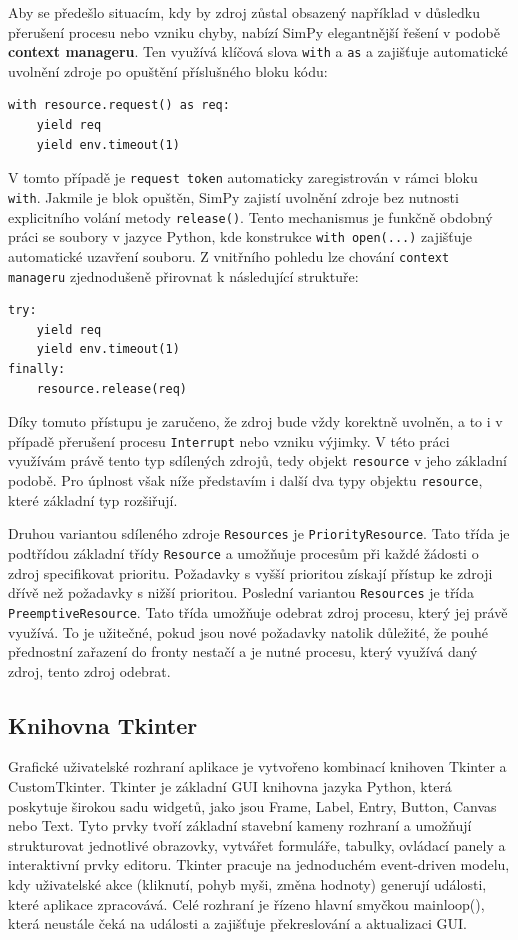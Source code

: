\documentclass[
  program=itp,
  biblatex,
  figures=false,
  glossaries,
  index
]{kidiplom}
\begin{document}
Aby se předešlo situacím, kdy by zdroj zůstal obsazený například v důsledku přerušení procesu nebo vzniku chyby, nabízí SimPy elegantnější řešení v podobě \textbf{context manageru}. Ten využívá klíčová slova \texttt{with} a \texttt{as} a zajišťuje automatické uvolnění zdroje po opuštění příslušného bloku kódu:

\begin{verbatim}
with resource.request() as req:
    yield req              
    yield env.timeout(1)
\end{verbatim}

V tomto případě je \texttt{request token} automaticky zaregistrován v rámci bloku \texttt{with}. Jakmile je blok opuštěn, SimPy zajistí uvolnění zdroje bez nutnosti explicitního volání metody \texttt{release()}. Tento mechanismus je funkčně obdobný práci se soubory v jazyce Python, kde konstrukce \texttt{with open(...)} zajišťuje automatické uzavření souboru. Z vnitřního pohledu lze chování \texttt{context manageru} zjednodušeně přirovnat k následující struktuře:

\begin{verbatim}
try:
    yield req
    yield env.timeout(1)
finally:
    resource.release(req)
\end{verbatim}

Díky tomuto přístupu je zaručeno, že zdroj bude vždy korektně uvolněn, a to i v případě přerušení procesu \texttt{Interrupt} nebo vzniku výjimky.  V této práci využívám právě tento typ sdílených zdrojů, tedy objekt \texttt{resource} v jeho základní podobě. Pro úplnost však níže představím i další dva typy objektu \texttt{resource}, které základní typ rozšiřují.

Druhou variantou sdíleného zdroje \texttt{Resources} je \texttt{PriorityResource}. Tato třída je podtřídou základní třídy \texttt{Resource} a umožňuje procesům při každé žádosti o zdroj specifikovat prioritu. Požadavky s vyšší prioritou získají přístup ke zdroji dřívě než požadavky s nižší prioritou. Poslední variantou \texttt{Resources} je třída \texttt{PreemptiveResource}. Tato třída umožňuje odebrat zdroj procesu, který jej právě využívá. To je užitečné, pokud jsou nové požadavky natolik důležité, že pouhé přednostní zařazení do fronty nestačí a je nutné procesu, který využívá daný zdroj, tento zdroj odebrat.

\subsection{Knihovna Tkinter}
Grafické uživatelské rozhraní aplikace je vytvořeno kombinací knihoven Tkinter a CustomTkinter. Tkinter je základní GUI knihovna jazyka Python, která poskytuje širokou sadu widgetů, jako jsou Frame, Label, Entry, Button, Canvas nebo Text. Tyto prvky tvoří základní stavební kameny rozhraní a umožňují strukturovat jednotlivé obrazovky, vytvářet formuláře, tabulky, ovládací panely a interaktivní prvky editoru. Tkinter pracuje na jednoduchém event‑driven modelu, kdy uživatelské akce (kliknutí, pohyb myši, změna hodnoty) generují události, které aplikace zpracovává. Celé rozhraní je řízeno hlavní smyčkou mainloop(), která neustále čeká na události a zajišťuje překreslování a aktualizaci GUI.
\end{document}
